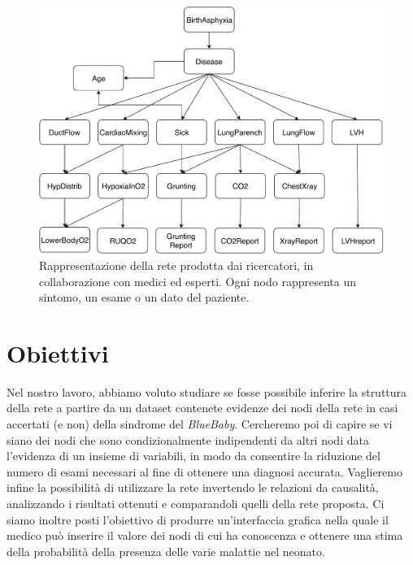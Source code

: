  \begin{figure}
 	\centering
 	\includegraphics[width=1\linewidth]{images/paper_structure}
 	\caption{Rappresentazione della rete prodotta dai ricercatori, in collaborazione con medici ed esperti. Ogni nodo rappresenta un sintomo, un esame o un dato del paziente.}
 	\label{fig:paperstructure}
 \end{figure}

\section{Obiettivi}
Nel nostro lavoro, abbiamo voluto studiare se fosse possibile inferire la struttura della rete a partire da un dataset contenete evidenze dei nodi della rete in casi accertati (e non) della sindrome del \textit{BlueBaby}. Cercheremo poi di capire se vi siano dei nodi che sono condizionalmente indipendenti da altri nodi data l'evidenza di un insieme di variabili, in modo da consentire la riduzione del numero di esami necessari al fine di ottenere una diagnosi accurata. Vaglieremo infine la possibilità di utilizzare la rete invertendo le relazioni da causalità, analizzando i risultati ottenuti e comparandoli quelli della rete proposta. Ci siamo inoltre posti l'obiettivo di produrre un'interfaccia grafica nella quale il medico può inserire il valore dei nodi di cui ha conoscenza e ottenere una stima della probabilità della presenza delle varie malattie nel neonato.